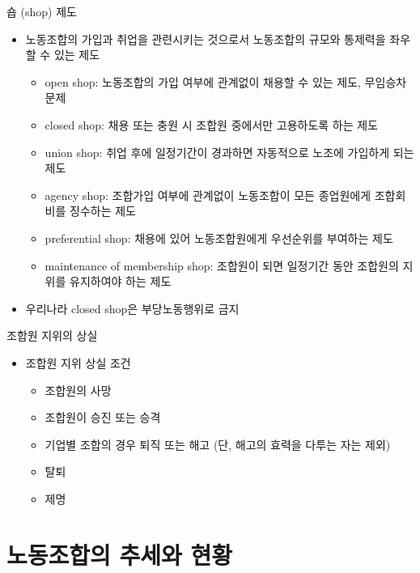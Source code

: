 \documentclass[aspectratio=169,xcolor=dvipsnames,handout]{beamer}
\begin{document}
\begin{frame}{숍 (shop) 제도}
    \begin{itemize}[<+->]
        \item 노동조합의 가입과 취업을 관련시키는 것으로서 노동조합의 규모와 통제력을 좌우할 수 있는 제도
        \begin{itemize}[<+->]
            \item open shop: 노동조합의 가입 여부에 관계없이 채용할 수 있는 제도, 무임승차 문제
            \item closed shop: 채용 또는 충원 시 조합원 중에서만 고용하도록 하는 제도
            \item union shop: 취업 후에 일정기간이 경과하면 자동적으로 노조에 가입하게 되는 제도
            \item agency shop: 조합가입 여부에 관계없이 노동조합이 모든 종업원에게 조합회비를 징수하는 제도
            \item preferential shop: 채용에 있어 노동조합원에게 우선순위를 부여하는 제도
            \item maintenance of membership shop: 조합원이 되면 일정기간 동안 조합원의 지위를 유지하여야 하는 제도
        \end{itemize}
        \item 우리나라 closed shop은 부당노동행위로 금지
    \end{itemize}
\end{frame}

\begin{frame}{조합원 지위의 상실}
    \begin{itemize}[<+->]
        \item 조합원 지위 상실 조건
        \begin{itemize}[<+->]
            \item 조합원의 사망
            \item 조합원이 승진 또는 승격
            \item 기업별 조합의 경우 퇴직 또는 해고  (단, 해고의 효력을 다투는 자는 제외)
            \item 탈퇴
            \item 제명
        \end{itemize}
    \end{itemize}
\end{frame}

\section{노동조합의 추세와 현황}
\end{document}
